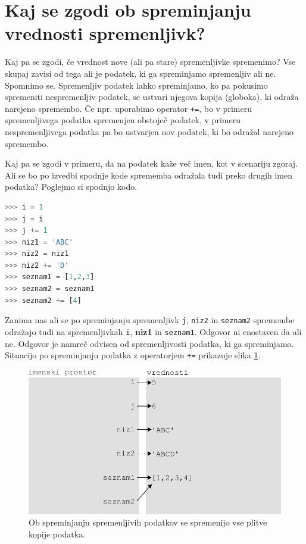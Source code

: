 \section{Kaj se zgodi ob spreminjanju vrednosti spremenljivk?}
Kaj pa se zgodi, če vrednost nove (ali pa stare) spremenljivke spremenimo? Vse skupaj zavisi od tega ali je podatek, ki ga spreminjamo spremenljiv ali ne. Spomnimo se. Spremenljiv podatek lahko spreminjamo, ko pa pokusimo spremeniti nespremenljiv podatek, se ustvari njegova kopija (globoka), ki odraža narejeno spremembo. Če npr. uporabimo operator \texttt{+=}, bo v primeru spremenljivega podatka spremenjen obstoječ podatek, v primeru nespremenljivega podatka pa bo ustvarjen nov podatek, ki bo odražal narejeno spremembo. 

Kaj pa se zgodi v primeru, da na podatek kaže več imen, kot v scenariju zgoraj. Ali se bo po izvedbi spodnje kode sprememba odražala tudi preko drugih imen podatka? Poglejmo si spodnjo kodo.
\begin{lstlisting}[language=Python]
>>> i = 1
>>> j = i
>>> j += 1
>>> niz1 = 'ABC'
>>> niz2 = niz1
>>> niz2 += 'D'
>>> seznam1 = [1,2,3]
>>> seznam2 = seznam1
>>> seznam2 += [4]
\end{lstlisting}
Zanima nas ali se po spreminjanju spremenljivk \texttt{j}, \texttt{niz2} in \texttt{seznam2} spremembe odražajo tudi na spremenljivkah \texttt{i}, \textbf{niz1} in \texttt{seznam1}. Odgovor ni enostaven da ali ne. Odgovor je namreč odvisen od spremenljivosti podatka, ki ga spreminjamo. Situacijo po spreminjanju podatka z operatorjem \texttt{+=} prikazuje slika \ref{img:spremenljivost_3}.
\begin{figure}
    \centering
    \includegraphics[width=\linewidth]{img/spremenljivost_3.pdf}
    \caption{Ob spreminjanju spremenljivih podatkov se spremenijo vse plitve kopije podatka.}
    \label{img:spremenljivost_3}
\end{figure}
